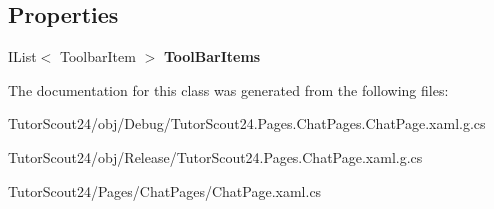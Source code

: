 \subsection*{Properties}
\begin{DoxyCompactItemize}
\item 
\mbox{\label{class_tutor_scout24_1_1_pages_1_1_chat_page_aac4a388f41564f9a6e02c6f9ace4607a}} 
I\+List$<$ Toolbar\+Item $>$ {\bfseries Tool\+Bar\+Items}
\end{DoxyCompactItemize}


The documentation for this class was generated from the following files\+:\begin{DoxyCompactItemize}
\item 
Tutor\+Scout24/obj/\+Debug/Tutor\+Scout24.\+Pages.\+Chat\+Pages.\+Chat\+Page.\+xaml.\+g.\+cs\item 
Tutor\+Scout24/obj/\+Release/Tutor\+Scout24.\+Pages.\+Chat\+Page.\+xaml.\+g.\+cs\item 
Tutor\+Scout24/\+Pages/\+Chat\+Pages/Chat\+Page.\+xaml.\+cs\end{DoxyCompactItemize}
